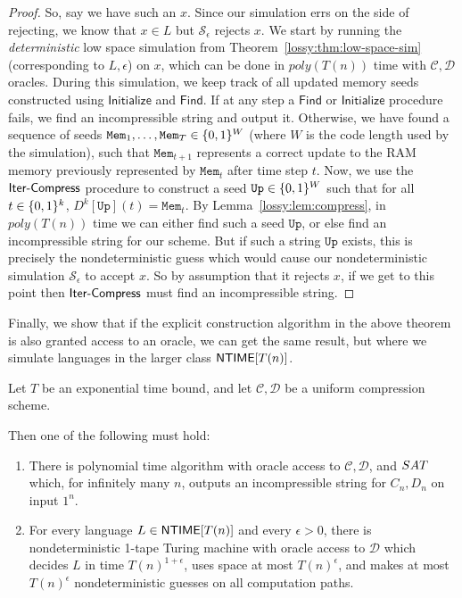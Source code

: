 \begin{proof}
So, say we have such an $x$. Since our simulation errs on the side of rejecting, we know that $x \in L$ but $\mathcal{S}_{\epsilon}$ rejects $x$. We start by running the \emph{deterministic} low space simulation from Theorem~\ref{lossy:thm:low-space-sim} (corresponding to $L, \epsilon$) on $x$, which can be done in $poly(T(n))$ time with $\mathcal{C},\mathcal{D}$ oracles. During this simulation, we keep track of all updated memory seeds constructed using $\mathsf{Initialize}$ and $\mathsf{Find}$. If at any step a $\mathsf{Find}$ or $\mathsf{Initialize}$ procedure fails, we find an incompressible string and output it. Otherwise, we have found a sequence of seeds $\mathtt{Mem}_1, \ldots, \mathtt{Mem}_T \in \{0,1\}^W$ (where $W$ is the code length used by the simulation), such that $\mathtt{Mem}_{t+1}$ represents a correct update to the RAM memory previously represented by $\mathtt{Mem}_t$ after time step $t$. Now, we use the $\mathsf{Iter\text{-} Compress}$ procedure to construct a seed $\mathtt{Up} \in \{0,1\}^W$ such that for all $t \in \{0,1\}^k$, $D^k[\mathtt{Up}](t) = \mathtt{Mem}_t$. By Lemma~\ref{lossy:lem:compress}, in $poly(T(n))$ time we can either find such a seed $\mathtt{Up}$, or else find an incompressible string for our scheme. But if such a string $\mathtt{Up}$ exists, this is precisely the nondeterministic guess which would cause our nondeterministic simulation $\mathcal{S}_{\epsilon}$ to accept $x$. So by assumption that it rejects $x$, if we get to this point then $\mathsf{Iter\text{-} Compress}$ must find an incompressible string.
\end{proof}
Finally, we show that if the explicit construction algorithm in the above theorem is also granted access to an  oracle, we can get the same result, but where we simulate languages in the larger class $\cl{NTIME}[T(n)]$.
\begin{theorem}\label{lossy:thm:full-ntisp-sim}
Let $T$ be an exponential time bound, and let $\mathcal{C},\mathcal{D}$ be a uniform compression scheme.

Then one of the following must hold:
\begin{enumerate}
    \item There is polynomial time algorithm with oracle access to $\mathcal{C},\mathcal{D}$, and ${\sc SAT}$ which, for infinitely many $n$, outputs an incompressible string for $C_n,D_n$ on input $1^n$.
    \item For every language $L \in \cl{NTIME}[T(n)]$ and every $\epsilon > 0$, there is nondeterministic 1-tape Turing machine with oracle access to $\mathcal{D}$ which decides $L$ in time $T(n)^{1+\epsilon}$, uses space at most $T(n)^{\epsilon}$, and makes at most $T(n)^{\epsilon}$ nondeterministic guesses on all computation paths.
\end{enumerate}
\end{theorem}
